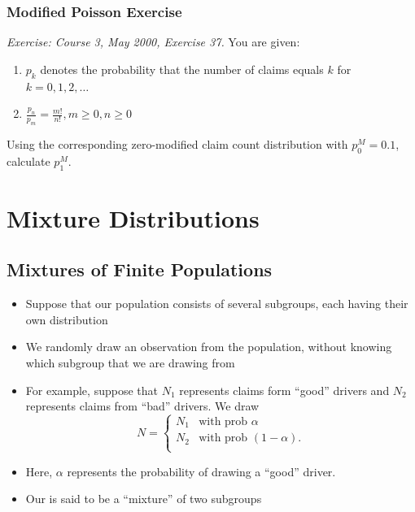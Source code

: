 \documentclass[]{book}
\begin{document}
\subsubsection{Modified Poisson
Exercise}\label{modified-poisson-exercise}

\emph{Exercise: Course 3, May 2000, Exercise 37.} You are given:

\begin{enumerate}
\def\labelenumi{\arabic{enumi}.}
\item
  \(p_k\) denotes the probability that the number of claims equals \(k\)
  for \(k=0,1,2,\ldots\)
\item
  \(\frac{p_n}{p_m}=\frac{m!}{n!}, m\ge 0, n\ge 0\)
\end{enumerate}

Using the corresponding zero-modified claim count distribution with
\(p_0^M=0.1\), calculate \(p_1^M\).

\section{Mixture Distributions}\label{mixture-distributions}

\subsection{Mixtures of Finite
Populations}\label{mixtures-of-finite-populations}

\begin{itemize}
\item
  Suppose that our population consists of several subgroups, each having
  their own distribution
\item
  We randomly draw an observation from the population, without knowing
  which subgroup that we are drawing from
\item
  For example, suppose that \(N_1\) represents claims form ``good''
  drivers and \(N_2\) represents claims from ``bad'' drivers. We draw
  \[N =
  \begin{cases}
  N_1  &  \text{with prob~}\alpha\\
  N_2  &   \text{with prob~}(1-\alpha) .\\
  \end{cases}\]
\item
  Here, \(\alpha\) represents the probability of drawing a ``good''
  driver.
\item
  Our is said to be a ``mixture'' of two subgroups
\end{itemize}
\end{document}
